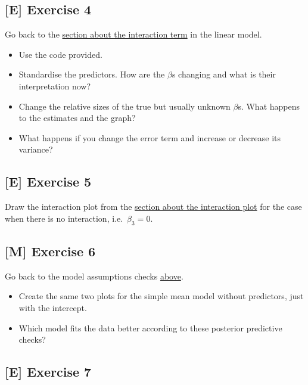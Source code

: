 \documentclass[
]{book}
\providecommand{\tightlist}{%
  \setlength{\itemsep}{0pt}\setlength{\parskip}{0pt}}
\begin{document}
\subsection{{[}E{]} Exercise 4}\label{exercise4_multiple_regression}

Go back to the \hyperref[interaction_term]{section about the interaction term} in the linear model.

\begin{itemize}
\tightlist
\item
  Use the code provided.
\item
  Standardise the predictors. How are the \(\beta\)s changing and what is their interpretation now?
\item
  Change the relative sizes of the true but usually unknown \(\beta\)s.
  What happens to the estimates and the graph?
\item
  What happens if you change the error term and increase or decrease its variance?
\end{itemize}

\subsection{{[}E{]} Exercise 5}\label{exercise5_multiple_regression}

Draw the interaction plot from the \hyperref[interaction_plot]{section about the interaction plot}
for the case when there is no interaction, i.e.~\(\beta_3 = 0\).

\subsection{{[}M{]} Exercise 6}\label{exercise6_multiple_regression}

Go back to the model assumptions checks \hyperref[check_model_bayes]{above}.

\begin{itemize}
\tightlist
\item
  Create the same two plots for the simple mean model without predictors, just with the intercept.
\item
  Which model fits the data better according to these posterior predictive checks?
\end{itemize}

\subsection{{[}E{]} Exercise 7}\label{exercise7_multiple_regression}
\end{document}
